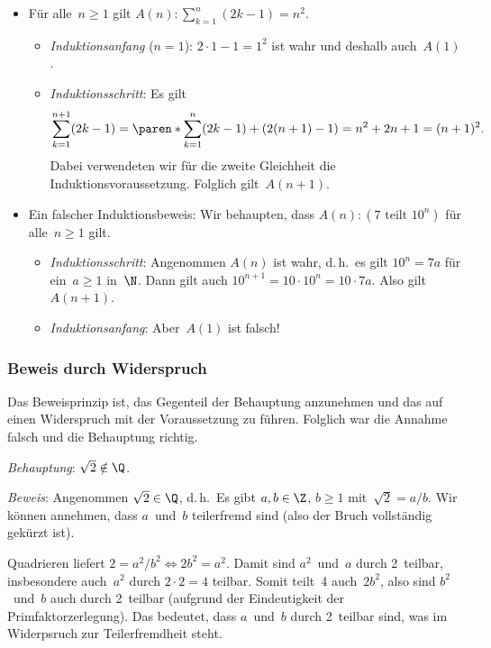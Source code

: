 \documentclass[a4paper]{article}
\begin{document}
\begin{example}\leavevmode
    \begin{itemize}
        \item Für alle~$n \geq 1$ gilt $A(n)\colon \sum_{k=1}^n (2k-1) = n^2$.
              \begin{itemize}
                  \item \emph{Induktionsanfang} ($n = 1$): $2 \cdot 1 - 1 = 1^2$ ist wahr und deshalb auch~$A(1)$.
                  \item \emph{Induktionsschritt}: Es gilt
                        \begin{equation*}
                            \sum_{k=1}^{n+1} (2k-1) = \paren*{\sum_{k=1}^n (2k-1)} + (2(n+1) - 1) = n^2 + 2n + 1 = (n+1)^2.
                        \end{equation*}
                        Dabei verwendeten wir für die zweite Gleichheit die Induktionsvoraussetzung. Folglich gilt~$A(n+1)$.
              \end{itemize}
        \item Ein falscher Induktionsbeweis: Wir behaupten, dass $A(n)\colon (7 \text{ teilt } 10^n)$ für alle~$n \geq 1$ gilt.
              \begin{itemize}
                  \item \emph{Induktionsschritt}: Angenommen $A(n)$ ist wahr, d.\,h.\ es gilt $10^n = 7a$ für ein~$a \geq 1$ in~$\N$. Dann gilt auch $10^{n+1} = 10 \cdot 10^n = 10 \cdot 7a$. Also gilt~$A(n+1)$.
                  \item \emph{Induktionsanfang}: Aber~$A(1)$ ist falsch!
              \end{itemize}
    \end{itemize}
\end{example}

\subsubsection{Beweis durch Widerspruch}

Das Beweisprinzip ist, das Gegenteil der Behauptung anzunehmen und das auf einen Widerspruch mit der Voraussetzung zu führen. Folglich war die Annahme falsch und die Behauptung richtig.

\begin{example}
    \emph{Behauptung}: $\sqrt{2} \notin \Q$.

    \emph{Beweis}: Angenommen $\sqrt{2} \in \Q$, d.\,h.\ Es gibt $a, b \in \Z$, $b \geq 1$ mit~$\sqrt{2} = a/b$. Wir können annehmen, dass $a$~und~$b$ teilerfremd sind (also der Bruch vollständig gekürzt ist).

    Quadrieren liefert $2 = a^2/b^2 \iff 2b^2 = a^2$. Damit sind $a^2$~und~$a$ durch 2~teilbar, insbesondere auch~$a^2$ durch $2\cdot2 = 4$ teilbar. Somit teilt~4 auch~$2b^2$, also sind $b^2$~und~$b$ auch durch 2~teilbar (aufgrund der Eindeutigkeit der Primfaktorzerlegung). Das bedeutet, dass $a$~und~$b$ durch 2~teilbar sind, was im Widerpsruch zur Teilerfremdheit steht.
\end{example}
\end{document}
